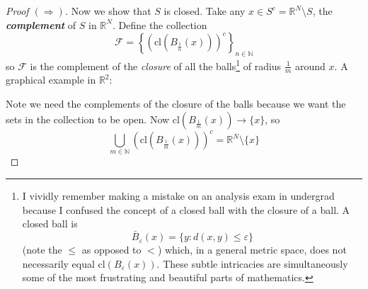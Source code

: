 \documentclass{article}
\newcommand{\cl}{\text{cl}}
\newcommand{\R}{\mathbb{R}}
\newcommand{\keyword}[1]{\textit{\textbf{#1}}\index{#1}}
\theoremstyle{mythm}
\theoremstyle{mydef}
\begin{document}
\begin{proof}[\textit{Proof} $(\Rightarrow)$]
  Now we show that $S$ is closed. Take any $x\in S^c = \R^N\setminus S$, the \keyword{complement} of $S$ in $\R^N$. Define the collection 
  \[
        \mathcal{F} = \left\{\left(\cl(B_{\frac{1}{n}}(x))\right)^c\right\}_{n \in \mathbb{N}}
  \]
  so $\mathcal{F}$ is the complement of the \textit{closure} of all the balls\footnote{
      I vividly remember making a mistake on an analysis exam in undergrad because I confused the concept of a closed ball with the closure of a ball. A closed ball is
      \begin{equation*}
          \bar{B}_{\varepsilon}(x) = \{ y : d(x,y) \leq \varepsilon \}
      \end{equation*}
      (note the $\leq$ as opposed to $<$) which, in a general metric space, does not necessarily equal $\cl(B_{\varepsilon}(x))$. These subtle intricacies are simultaneously some of the most frustrating and beautiful parts of mathematics.
  } of radius $\frac{1}{m}$ around $x$. A graphical example in $\R^2$:
  \begin{figure}[H]
    \centering
  \end{figure}
  Note we need the complements of the closure of the balls because we want the sets in the collection to be open. Now $\cl(B_{\frac{1}{m}}(x)) \to \{x\}$, so
  \[
    \bigcup_{m \in \mathbb{N}} \left(\cl(B_{\frac{1}{m}}(x))\right)^c = \mathbb{R}^N \setminus \{x\}
  \]


\end{proof}
\end{document}

